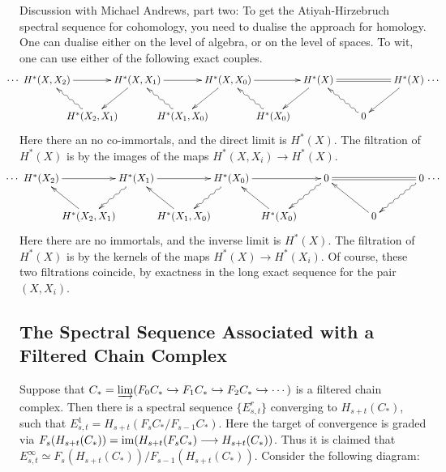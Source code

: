 \documentclass[11pt]{article}
\newcommand{\myheading}[1]
{{\noindent\Large #1}

}
\renewcommand{\myheading}[1]{\subsection{#1}}
\begin{document}
{\color{red}Discussion with Michael Andrews, part two:}
To get the Atiyah-Hirzebruch spectral sequence for cohomology, you need to
dualise the approach for homology. One can dualise either on the level of
algebra, or on the level of spaces. To wit, one can use either of the following
exact couples.
\[\xymatrix@!0@C=1.6cm@R=1.28cm{%
\makebox[0cm][r]{$\cdots$\
}H^*(X,X_2)\ar[rr]&&H^*(X,X_1)\ar[rr]\ar[ld]&&H^*(X,X_0)\ar[rr]
\ar[ld]&&H^*(X)\ar[ld]
\ar@{=}[rr]&&H^*(X)\makebox[0cm][l]{\ $\cdots$}\ar[ld]\\
&H^*(X_2,X_1)\ar@{~>}[ul]&&
H^*(X_1,X_0)\ar@{~>}[lu]&&
H^*(X_0)\ar@{~>}[lu]&&
0\ar@{~>}[lu]
}\]
Here there an no co-immortals, and the direct limit is $H^*(X)$. The filtration
of $H^*(X)$ is by the images of the maps $H^*(X,X_i)\to H^*(X)$.
\[\xymatrix@!0@C=1.6cm@R=1.28cm{%
\makebox[0cm][r]{$\cdots$\ }
H^*(X_2)\ar[rr]&&
H^*(X_1)\ar[rr]\ar@{~>}[ld]&&
H^*(X_0)\ar[rr] \ar@{~>}[ld]&&\ar@{~>}[ld]
0\ar@{=}[rr]&&
0\makebox[0cm][l]{\ $\cdots$}\ar@{~>}[ld]\\
&H^*(X_2,X_1)\ar[ul]&&
H^*(X_1,X_0)\ar[lu]&&
H^*(X_0)\ar[lu]&&
0\ar[lu]
}\]
Here there are no immortals, and the inverse limit is $H^*(X)$. The filtration
of $H^*(X)$ is by the kernels of the maps $H^*(X)\to H^*(X_i)$. Of course, these
two filtrations coincide, by exactness in the long exact sequence for the pair
$(X,X_i)$.
\myheading{The Spectral Sequence Associated with a Filtered Chain Complex}
\newcommand{\theexp}[4]{\raisebox{-.1cm}[.5cm][0cm]
{\mbox{$\begin{array}{c}H_{#1}(\frac{F_{#2}}{F_{#3}}) \\
=E^1_{#4} \end{array}$}}}%
Suppose that $C_*=\varinjlim(F_0C_*\hookrightarrow F_1C_*\hookrightarrow
F_2C_*\hookrightarrow\cdots)$ is a filtered chain complex. Then there is a
spectral sequence $\{E^r_{s,t}\}$ converging to $H_{s+t}(C_*)$, such that
$E^1_{s,t}=H_{s+t}(F_sC_*/F_{s-1}C_*)$. Here the target of convergence is graded
via $F_s(H_{s+t}(C_*))=\operatorname{im}(H_{s+t}(F_sC_*)\longrightarrow H_{s+t}(C_*))$. Thus it is claimed
that $E^\infty_{s,t}\simeq F_s(H_{s+t}(C_*))/F_{s-1}(H_{s+t}(C_*))$. Consider
the following diagram:
\end{document}
